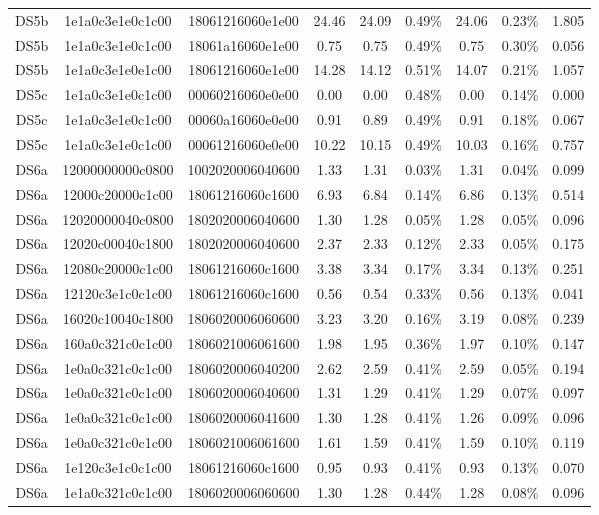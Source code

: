 \begin{tabular}{|c|c c|c|c c|c c|c|}
  DS5b & 1e1a0c3e1e0c1c00 & 18061216060e1e00 & 24.46 & 24.09 & 0.49\% & 24.06 & 0.23\% & 1.805 \\
  DS5b & 1e1a0c3e1e0c1c00 & 18061a16060e1e00 & 0.75 & 0.75 & 0.49\% & 0.75 & 0.30\% & 0.056 \\
  DS5b & 1e1a0c3e1e0e1c00 & 18061216060e1e00 & 14.28 & 14.12 & 0.51\% & 14.07 & 0.21\% & 1.057 \\
  DS5c & 1e1a0c3e1e0c1c00 & 00060216060e0e00 & 0.00 & 0.00 & 0.48\% & 0.00 & 0.14\% & 0.000 \\
  DS5c & 1e1a0c3e1e0c1c00 & 00060a16060e0e00 & 0.91 & 0.89 & 0.49\% & 0.91 & 0.18\% & 0.067 \\
  DS5c & 1e1a0c3e1e0c1c00 & 00061216060e0e00 & 10.22 & 10.15 & 0.49\% & 10.03 & 0.16\% & 0.757 \\
  DS6a & 12000000000c0800 & 1002020006040600 & 1.33 & 1.31 & 0.03\% & 1.31 & 0.04\% & 0.099 \\
  DS6a & 12000c20000c1c00 & 18061216060c1600 & 6.93 & 6.84 & 0.14\% & 6.86 & 0.13\% & 0.514 \\
  DS6a & 12020000040c0800 & 1802020006040600 & 1.30 & 1.28 & 0.05\% & 1.28 & 0.05\% & 0.096 \\
  DS6a & 12020c00040c1800 & 1802020006040600 & 2.37 & 2.33 & 0.12\% & 2.33 & 0.05\% & 0.175 \\
  DS6a & 12080c20000c1c00 & 18061216060c1600 & 3.38 & 3.34 & 0.17\% & 3.34 & 0.13\% & 0.251 \\
  DS6a & 12120c3e1c0c1c00 & 18061216060c1600 & 0.56 & 0.54 & 0.33\% & 0.56 & 0.13\% & 0.041 \\
  DS6a & 16020c10040c1800 & 1806020006060600 & 3.23 & 3.20 & 0.16\% & 3.19 & 0.08\% & 0.239 \\
  DS6a & 160a0c321c0c1c00 & 1806021006061600 & 1.98 & 1.95 & 0.36\% & 1.97 & 0.10\% & 0.147 \\
  DS6a & 1e0a0c321c0c1c00 & 1806020006040200 & 2.62 & 2.59 & 0.41\% & 2.59 & 0.05\% & 0.194 \\
  DS6a & 1e0a0c321c0c1c00 & 1806020006040600 & 1.31 & 1.29 & 0.41\% & 1.29 & 0.07\% & 0.097 \\
  DS6a & 1e0a0c321c0c1c00 & 1806020006041600 & 1.30 & 1.28 & 0.41\% & 1.26 & 0.09\% & 0.096 \\
  DS6a & 1e0a0c321c0c1c00 & 1806021006061600 & 1.61 & 1.59 & 0.41\% & 1.59 & 0.10\% & 0.119 \\
  DS6a & 1e120c3e1c0c1c00 & 18061216060c1600 & 0.95 & 0.93 & 0.41\% & 0.93 & 0.13\% & 0.070 \\
  DS6a & 1e1a0c321c0c1c00 & 1806020006060600 & 1.30 & 1.28 & 0.44\% & 1.28 & 0.08\% & 0.096 \\

\end{tabular}
